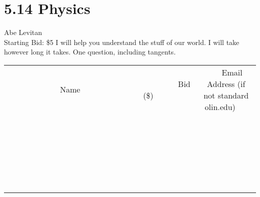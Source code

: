 \documentclass[11pt]{article}
\begin{document}
\section*{5.14 Physics}
Abe Levitan
\\
Starting Bid: \$5
\newline
I will help you understand the stuff of our world. I will take however long it takes.
One question, including tangents.
\\[6ex]
\begin{tabular}{c c c}
~~~~~~~~~~~~~Name~~~~~~~~~~~~~ & ~~~~~~~~~Bid (\$)~~~~~~~~~  & ~~~Email Address (if not standard olin.edu)~~~\\
 & & \\
\hline
 & & \\
\hline
 & & \\
\hline
 & & \\
\hline
 & & \\
\hline
 & & \\
\hline
 & & \\
\hline
 & & \\
\hline
 & & \\
\hline
 & & \\
\hline
 & & \\
\hline
 & & \\
\hline
 & & \\
\hline
 & & \\
\hline
 & & \\
\hline
 & & \\
\hline
 & & \\
\hline
 & & \\
\hline
 & & \\
\hline
 & & \\
\hline
 & & \\
\hline
 & & \\
\hline
 & & \\
\hline
 & & \\
\hline
 & & \\
\hline
 & & \\
\hline
\end{tabular}
\newpage
\end{document}
